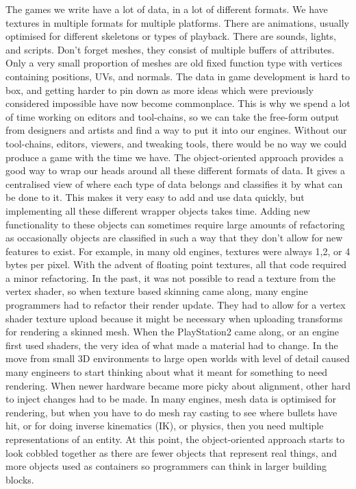 \documentclass[a4paper,12pt]{book}
\begin{document}
The games we write have a lot of data, in a lot of different formats.
We have textures in multiple formats for multiple platforms.
There are animations, usually optimised for different skeletons or types of playback.
There are sounds, lights, and scripts.
Don't forget meshes, they consist of multiple buffers of attributes.
Only a very small proportion of meshes are old fixed function type with vertices containing positions, UVs, and normals.
The data in game development is hard to box, and getting harder to pin down as more ideas which were previously considered impossible have now become commonplace.
This is why we spend a lot of time working on editors and tool-chains, so we can take the free-form output from designers and artists and find a way to put it into our engines.
Without our tool-chains, editors, viewers, and tweaking tools, there would be no way we could produce a game with the time we have.
The object-oriented approach provides a good way to wrap our heads around all these different formats of data.
It gives a centralised view of where each type of data belongs and classifies it by what can be done to it.
This makes it very easy to add and use data quickly, but implementing all these different wrapper objects takes time.
Adding new functionality to these objects can sometimes require large amounts of refactoring as occasionally objects are classified in such a way that they don't allow for new features to exist.
For example, in many old engines, textures were always 1,2, or 4 bytes per pixel.
With the advent of floating point textures, all that code required a minor refactoring.
In the past, it was not possible to read a texture from the vertex shader, so when texture based skinning came along, many engine programmers had to refactor their render update.
They had to allow for a vertex shader texture upload because it might be necessary when uploading transforms for rendering a skinned mesh.
When the PlayStation2 came along, or an engine first used shaders, the very idea of what made a material had to change.
In the move from small 3D environments to large open worlds with level of detail caused many engineers to start thinking about what it meant for something to need rendering.
When newer hardware became more picky about alignment, other hard to inject changes had to be made.
In many engines, mesh data is optimised for rendering, but when you have to do mesh ray casting to see where bullets have hit, or for doing inverse kinematics (IK), or physics, then you need multiple representations of an entity.
At this point, the object-oriented approach starts to look cobbled together as there are fewer objects that represent real things, and more objects used as containers so programmers can think in larger building blocks.
\end{document}
